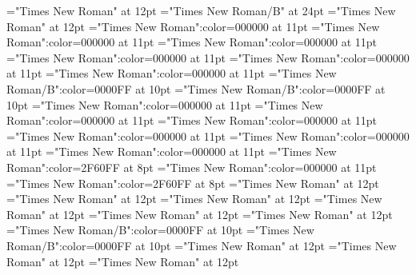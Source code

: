 \documentclass[a4paper]{article}
\begin{document}
 
\pagestyle{plain} 
\font{}="Times New Roman" at 12pt
\font{}="Times New Roman/B" at 24pt
\font{}="Times New Roman" at 12pt
\font\entryletDatadicBody="Times New Roman":color=000000 at 11pt
\font\pictureRightentryletDatadicBody="Times New Roman":color=000000 at 11pt
\font\picturepictureRightentryletDatadicBody="Times New Roman":color=000000 at 11pt
\font\pictureCaptionpictureRightentryletDatadicBody="Times New Roman":color=000000 at 11pt
\font\CmPicturepublishStemCaptionSenseNumberpictureCaptionpictureRightentryletDatadicBody="Times New Roman":color=000000 at 11pt
\font\CmPicturepublishStemCaptionCaptionPubptpictureCaptionpictureRightentryletDatadicBody="Times New Roman":color=000000 at 11pt
\font\headwordsehentryletDatadicBody="Times New Roman/B":color=0000FF at 10pt
\font\headwordafterentryletDatadicBody="Times New Roman/B":color=0000FF at 10pt
\font\sensesentryletDatadicBody="Times New Roman":color=000000 at 11pt
\font\sensesensesentryletDatadicBody="Times New Roman":color=000000 at 11pt
\font\grammaticalinfosensesensesentryletDatadicBody="Times New Roman":color=000000 at 11pt
\font\partofspeechptgrammaticalinfosensesensesentryletDatadicBody="Times New Roman":color=000000 at 11pt
\font{}="Times New Roman":color=000000 at 11pt
\font\xitemptdefinitionLcptsensesensesentryletDatadicBody="Times New Roman":color=000000 at 11pt
\font\xlanguagetagenxitemptdefinitionLcptsensesensesentryletDatadicBody="Times New Roman":color=2F60FF at 8pt
\font\xitemendefinitionLcptsensesensesentryletDatadicBody="Times New Roman":color=000000 at 11pt
\font\xlanguagetagenxitemendefinitionLcptsensesensesentryletDatadicBody="Times New Roman":color=2F60FF at 8pt
\font\entrybletDatadicBody="Times New Roman" at 12pt
\font\pictureRightentrybletDatadicBody="Times New Roman" at 12pt
\font\picturepictureRightentrybletDatadicBody="Times New Roman" at 12pt
\font\pictureCaptionpictureRightentrybletDatadicBody="Times New Roman" at 12pt
\font\CmPicturepublishStemCaptionSenseNumberpictureCaptionpictureRightentrybletDatadicBody="Times New Roman" at 12pt
\font\CmPicturepublishStemCaptionCaptionPubptpictureCaptionpictureRightentrybletDatadicBody="Times New Roman" at 12pt
\font\headwordsehentrybletDatadicBody="Times New Roman/B":color=0000FF at 10pt
\font\headwordafterentrybletDatadicBody="Times New Roman/B":color=0000FF at 10pt
\font\sensesentrybletDatadicBody="Times New Roman" at 12pt
\font\sensesensesentrybletDatadicBody="Times New Roman" at 12pt
\font\grammaticalinfosensesensesentrybletDatadicBody="Times New Roman" at 12pt
\end{document}
